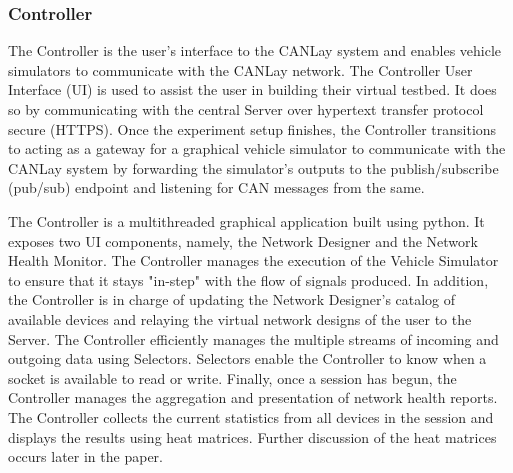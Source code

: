 \documentclass[letterpaper,twocolumn,12pt]{article}
\begin{document}
\subsubsection{Controller}
The Controller is the user's interface to the CANLay system and enables vehicle simulators to communicate with the CANLay network. The Controller User Interface (UI) is used to assist the user in building their virtual testbed. 
It does so by communicating with the central Server over hypertext transfer protocol secure (HTTPS). 
Once the experiment setup finishes, the Controller transitions to acting as a gateway for a graphical vehicle simulator to communicate with the CANLay system by forwarding the simulator's outputs to the publish/subscribe (pub/sub) endpoint and listening for CAN messages from the same.

The Controller is a multithreaded graphical application built using python. It exposes two UI components, namely, the Network Designer and the Network Health Monitor. 
The Controller manages the execution of the Vehicle Simulator to ensure that it stays "in-step" with the flow of signals produced. 
In addition, the Controller is in charge of updating the Network Designer's catalog of available devices and relaying the virtual network designs of the user to the Server. The Controller efficiently manages the multiple streams of incoming and outgoing data using Selectors. Selectors enable the Controller to know when a socket is available to read or write. Finally, once a session has begun, the Controller manages the aggregation and presentation of network health reports. The Controller collects the current statistics from all devices in the session and displays the results using heat matrices. Further discussion of the heat matrices occurs later in the paper.
\end{document}
